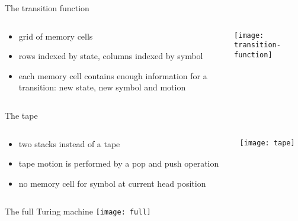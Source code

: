 \begin{frame}{The transition function}
  \begin{columns}
	\begin{column}{0.5\textwidth}
	  \begin{itemize}
	  \item grid of memory cells
	  \item rows indexed by state, columns indexed by symbol
	  \item each memory cell contains enough information for a transition: new
		state, new symbol and motion
	  \end{itemize}
	\end{column}
	\begin{column}{0.5\textwidth}
	  \centering
	  \texttt{[image: transition-function]}
	\end{column}
  \end{columns}
\end{frame}

\begin{frame}{The tape}
  \begin{columns}
	\begin{column}{0.5\textwidth}
	  \begin{itemize}
	  \item two stacks instead of a tape
	  \item tape motion is performed by a pop and push operation
	  \item no memory cell for symbol at current head position
	  \end{itemize}
	\end{column}
	\begin{column}{0.5\textwidth}
	  \texttt{[image: tape]}
	\end{column}
  \end{columns}
\end{frame}

\begin{frame}{The full Turing machine}
  \centering
  \texttt{[image: full]}
\end{frame}